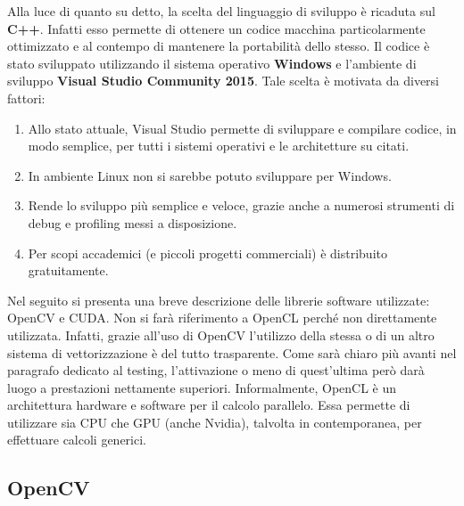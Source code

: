 Alla luce di quanto su detto, la scelta del linguaggio di sviluppo è ricaduta sul \textbf{C++}. Infatti esso permette di ottenere un codice macchina particolarmente ottimizzato e al contempo di mantenere la portabilità dello stesso. Il codice è stato sviluppato utilizzando il sistema operativo \textbf{Windows} e l'ambiente di sviluppo \textbf{Visual Studio Community 2015}. Tale scelta è motivata da diversi fattori:
\begin{enumerate}
	\item Allo stato attuale, Visual Studio permette di sviluppare e compilare codice, in modo semplice, per tutti i sistemi operativi e le architetture su citati.
	\item In ambiente Linux non si sarebbe potuto sviluppare per Windows.
	\item Rende lo sviluppo più semplice e veloce, grazie anche a numerosi strumenti di debug e profiling messi a disposizione.
	\item Per scopi accademici (e piccoli progetti commerciali) è distribuito gratuitamente.
\end{enumerate}

Nel seguito si presenta una breve descrizione delle librerie software utilizzate: OpenCV e CUDA. Non si farà riferimento a OpenCL perché non direttamente utilizzata. Infatti, grazie all'uso di OpenCV l'utilizzo della stessa o di un altro sistema di vettorizzazione è del tutto trasparente. Come sarà chiaro più avanti nel paragrafo dedicato al testing, l'attivazione o meno di quest'ultima però darà luogo a prestazioni nettamente superiori. Informalmente, OpenCL è un architettura hardware e software per il calcolo parallelo. Essa permette di utilizzare sia CPU che GPU (anche Nvidia), talvolta in contemporanea, per effettuare calcoli generici.

\subsection{OpenCV}
\label{sec:tools:opencv}

